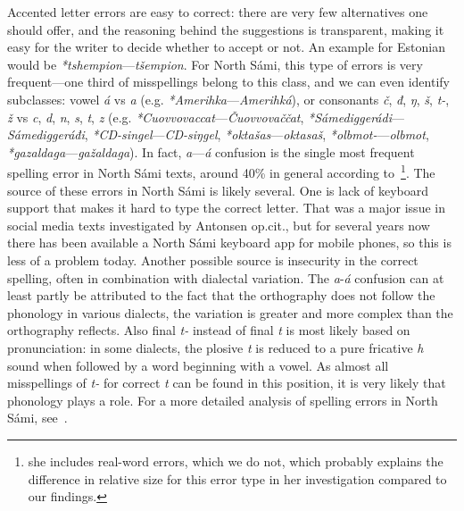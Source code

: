 \documentclass{flammie}
\newcommand{\samit}{\mbox{t\hspace{-.35em}-}} %
\begin{document}
Accented letter errors are easy to correct: there are very few alternatives one
should offer, and the reasoning behind the suggestions is transparent, making it
easy for the writer to decide whether to accept or not. An example for Estonian
would be \textit{*tshempion}---\textit{tšempion}. For North Sámi, this type of
errors is very frequent---one third of misspellings belong to this class, and we
can even identify subclasses: vowel \textit{á} vs \textit{a} (e.g.
\textit{*Amerihka}---\textit{Amerihká}), or consonants \textit{č}, \textit{đ},
\textit{ŋ}, \textit{š}, \textit{\samit}, \textit{ž} vs \textit{c}, \textit{d},
\textit{n}, \textit{s}, \textit{t}, \textit{z} (e.g.
\textit{*Cuovvovaccat}---\textit{Čuovvovaččat},
\textit{*Sámediggerádi}---\textit{Sámediggeráđi},
\textit{*CD-singel}---\textit{CD-siŋgel}, \textit{*oktašas}---\textit{oktasaš},
\textit{*olbmo\samit}---\textit{olbmot},
\textit{*gazaldaga}---\textit{gažaldaga}). In fact, \textit{a}---\textit{á}
confusion is the single most frequent spelling error in North Sámi texts, around
40\% in general according to~\cite[p
24]{antonsen2013callinmeattahusaid}\footnote{she includes real-word errors,
which we do not, which probably explains the difference in relative size for
this error type in her investigation compared to our findings.}.  The source of
these errors in North Sámi is likely several. One is lack of keyboard support
that makes it hard to type the correct letter. That was a major issue in social
media texts investigated by Antonsen op.cit., but for several years now there
has been available a North Sámi keyboard app for mobile phones, so this is less
of a problem today. Another possible source is insecurity in the correct
spelling, often in combination with dialectal variation. The
\textit{a}-\textit{á} confusion can at least partly be attributed to the fact
that the orthography does not follow the phonology in various dialects, the
variation is greater and more complex than the orthography reflects. Also final
\textit{\samit} instead of final \textit{t} is most likely based on
pronunciation: in some dialects, the plosive \textit{t} is reduced to a pure
fricative \textit{h} sound when followed by a word beginning with a vowel. As
almost all misspellings of \textit{\samit} for correct \textit{t} can be found
in this position, it is very likely that phonology plays a role. For a more
detailed analysis of spelling errors in North Sámi,
see~\cite{antonsen2013callinmeattahusaid}.
\end{document}

